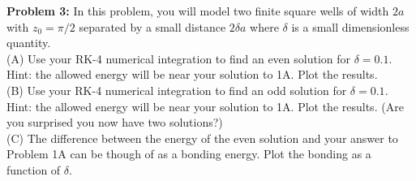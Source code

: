 \documentclass[12pt]{book}
\begin{document}
\noindent
{\bf Problem 3:}  In this problem, you will model two finite square wells of width $2a$ with $z_0=\pi/2$ separated by a small distance $2 \delta a$ where $\delta$ is a small dimensionless quantity.\\[5pt]

\noindent
(A) Use your RK-4 numerical integration to find an even solution for $\delta=0.1$.  Hint: the allowed energy will be near your solution to 1A.  Plot the results.\\[5pt]

\noindent
(B) Use your RK-4 numerical integration to find an odd solution for $\delta=0.1$.  Hint: the allowed energy will be near your solution to 1A.  Plot the results.  (Are you surprised you now have two solutions?)\\[5pt]

\noindent
(C) The difference between the energy of the even solution and your answer to Problem 1A can be though of as a bonding energy.  Plot the bonding as a function of $\delta$.\\[5pt]
\end{document}
